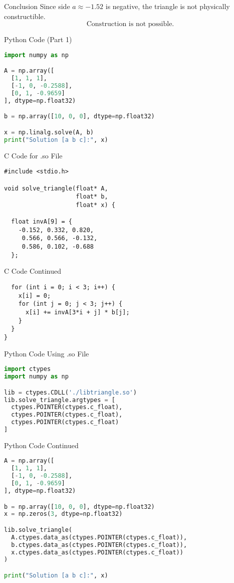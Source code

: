 \documentclass{beamer}
\begin{document}
\begin{frame}{Conclusion}
Since side \( a \approx -1.52 \) is negative,  
the triangle is not physically constructible.
\[
\text{Construction is not possible.}
\]
\end{frame}

\begin{frame}[fragile]{Python Code (Part 1)}
\begin{lstlisting}[language=Python]
import numpy as np

A = np.array([
  [1, 1, 1],
  [-1, 0, -0.2588],
  [0, 1, -0.9659]
], dtype=np.float32)

b = np.array([10, 0, 0], dtype=np.float32)

x = np.linalg.solve(A, b)
print("Solution [a b c]:", x)
\end{lstlisting}
\end{frame}

\begin{frame}[fragile]{C Code for .so File}
\begin{lstlisting}
#include <stdio.h>

void solve_triangle(float* A,
                    float* b,
                    float* x) {

  float invA[9] = {
    -0.152, 0.332, 0.820,
     0.566, 0.566, -0.132,
     0.586, 0.102, -0.688
  };
\end{lstlisting}
\end{frame}

\begin{frame}[fragile]{C Code Continued}
\begin{lstlisting}
  for (int i = 0; i < 3; i++) {
    x[i] = 0;
    for (int j = 0; j < 3; j++) {
      x[i] += invA[3*i + j] * b[j];
    }
  }
}
\end{lstlisting}
\end{frame}

\begin{frame}[fragile]{Python Code Using .so File}
\begin{lstlisting}[language=Python]
import ctypes
import numpy as np

lib = ctypes.CDLL('./libtriangle.so')
lib.solve_triangle.argtypes = [
  ctypes.POINTER(ctypes.c_float),
  ctypes.POINTER(ctypes.c_float),
  ctypes.POINTER(ctypes.c_float)
]
\end{lstlisting}
\end{frame}

\begin{frame}[fragile]{Python Code Continued}
\begin{lstlisting}[language=Python]
A = np.array([
  [1, 1, 1],
  [-1, 0, -0.2588],
  [0, 1, -0.9659]
], dtype=np.float32)

b = np.array([10, 0, 0], dtype=np.float32)
x = np.zeros(3, dtype=np.float32)

lib.solve_triangle(
  A.ctypes.data_as(ctypes.POINTER(ctypes.c_float)),
  b.ctypes.data_as(ctypes.POINTER(ctypes.c_float)),
  x.ctypes.data_as(ctypes.POINTER(ctypes.c_float))
)

print("Solution [a b c]:", x)
\end{lstlisting}
\end{frame}
\end{document}
